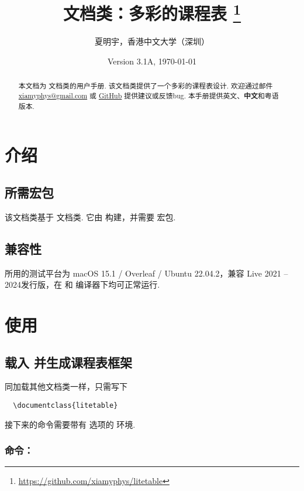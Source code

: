 \documentclass[letterpaper]{l3doc}
\title
{
  \cls{litetable} 文档类：多彩的课程表
  \thanks{\url{https://github.com/xiamyphys/litetable}}
}
\author{夏明宇，香港中文大学（深圳）}
\affil{\href{mailto:xiamyphys@gmail.com}{xiamyphys@gmail.com}}
\date{Version 3.1A, \today}
\begin{document}
\maketitle

\begin{abstract}
  本文档为  文档类的用户手册. 该文档类提供了一个多彩的课程表设计. 欢迎通过邮件 \href{mailto:xiamyphys@gmail.com}{xiamyphys@gmail.com} 或 \href{https://github.com/xiamyphys/litetable/issues}{GitHub} 提供建议或反馈bug. 本手册提供英文、\textbf{中文}和粤语版本.
\end{abstract}

\section{介绍}

\subsection{所需宏包}

该文档类基于  文档类. 它由  构建，并需要  宏包. 

\subsection{兼容性}

所用的测试平台为 macOS 15.1 / Overleaf / Ubuntu 22.04.2，兼容 Live 2021 -- 2024发行版，在  和  编译器下均可正常运行.

\section{使用}

\subsection{载入  并生成课程表框架}

同加载其他文档类一样，只需写下

\begin{Verbatim}
  \documentclass{litetable}
\end{Verbatim}

接下来的命令需要带有  选项的  环境.

\subsubsection{命令：}
\end{document}
